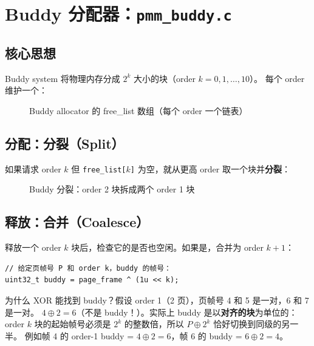 \section{Buddy 分配器：\texttt{pmm\_buddy.c}}

\subsection{核心思想}

Buddy system 将物理内存分成 $2^k$ 大小的块（order $k = 0, 1, \ldots, 10$）。
每个 order 维护一个：

\begin{figure}[H]
  \centering
  
  \caption{Buddy allocator 的 free\_list 数组（每个 order 一个链表）}
\end{figure}

\subsection{分配：分裂（Split）}

如果请求 order $k$ 但 \texttt{free\_list[$k$]} 为空，就从更高 order 取一个块并\textbf{分裂}：

\begin{figure}[H]
  \centering
  
  \caption{Buddy 分裂：order 2 块拆成两个 order 1 块}
\end{figure}

\subsection{释放：合并（Coalesce）}

释放一个 order $k$ 块后，检查它的是否也空闲。如果是，合并为 order $k+1$：

\begin{lstlisting}[style=cstyle]
// 给定页帧号 P 和 order k，buddy 的帧号：
uint32_t buddy = page_frame ^ (1u << k);
\end{lstlisting}

\begin{thinkbox}
为什么 XOR 能找到 buddy？假设 order 1（2 页），页帧号 4 和 5 是一对，6 和 7 是一对。
$4 \oplus 2 = 6$（不是 buddy！）。实际上 buddy 是以\textbf{对齐的块}为单位的：
order $k$ 块的起始帧号必须是 $2^k$ 的整数倍，所以 $P \oplus 2^k$ 恰好切换到同级的另一半。
例如帧 4 的 order-1 buddy = $4 \oplus 2 = 6$，帧 6 的 buddy = $6 \oplus 2 = 4$。
\end{thinkbox}


